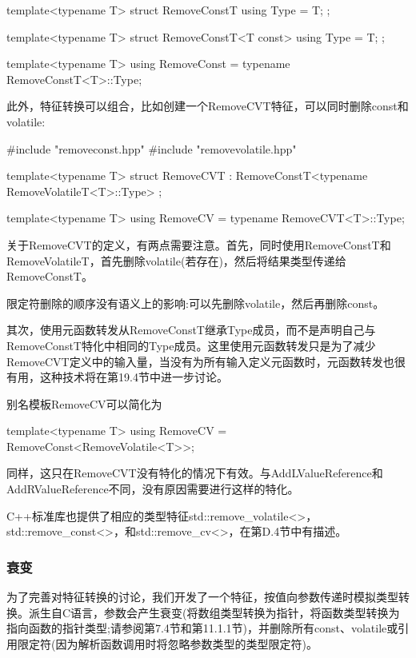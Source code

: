 \begin{cpp}
template<typename T>
struct RemoveConstT {
	using Type = T;
};

template<typename T>
struct RemoveConstT<T const> {
	using Type = T;
};

template<typename T>
using RemoveConst = typename RemoveConstT<T>::Type;
\end{cpp}

此外，特征转换可以组合，比如创建一个RemoveCVT特征，可以同时删除const和volatile:

\begin{cpp}
#include "removeconst.hpp"
#include "removevolatile.hpp"

template<typename T>
struct RemoveCVT : RemoveConstT<typename RemoveVolatileT<T>::Type> {
};

template<typename T>
using RemoveCV = typename RemoveCVT<T>::Type;
\end{cpp}

关于RemoveCVT的定义，有两点需要注意。首先，同时使用RemoveConstT和RemoveVolatileT，首先删除volatile(若存在)，然后将结果类型传递给RemoveConstT。

\begin{notice}限定符删除的顺序没有语义上的影响:可以先删除volatile，然后再删除const。
\end{notice}

其次，使用元函数转发从RemoveConstT继承Type成员，而不是声明自己与RemoveConstT特化中相同的Type成员。这里使用元函数转发只是为了减少RemoveCVT定义中的输入量，当没有为所有输入定义元函数时，元函数转发也很有用，这种技术将在第19.4节中进一步讨论。

别名模板RemoveCV可以简化为

\begin{cpp}
template<typename T>
using RemoveCV = RemoveConst<RemoveVolatile<T>>;
\end{cpp}

同样，这只在RemoveCVT没有特化的情况下有效。与AddLValueReference和AddRValueReference不同，没有原因需要进行这样的特化。

C++标准库也提供了相应的类型特征std::remove\_volatile<>， std::remove\_const<>，和std::remove\_cv<>，在第D.4节中有描述。

\subsubsection{衰变}

为了完善对特征转换的讨论，我们开发了一个特征，按值向参数传递时模拟类型转换。派生自C语言，参数会产生衰变(将数组类型转换为指针，将函数类型转换为指向函数的指针类型;请参阅第7.4节和第11.1.1节)，并删除所有const、volatile或引用限定符(因为解析函数调用时将忽略参数类型的类型限定符)。

